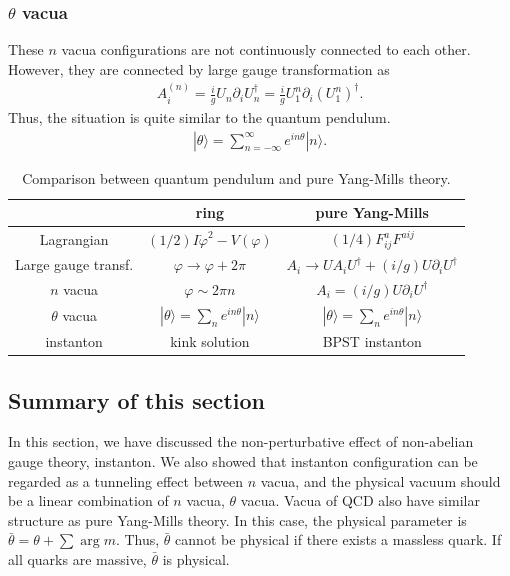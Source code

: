 \documentclass[11pt,a4paper]{article}
\begin{document}
\subsubsection{$\theta$ vacua}
These $n$ vacua configurations are not continuously connected to each other. However, they are connected by large gauge transformation as
\begin{align}
    A_i^{(n)} = \frac{i}{g} U_n \partial_i U_n^\dagger = \frac{i}{g} U_1^n \partial_i (U_1^n)^\dagger.
\end{align}
Thus, the situation is quite similar to the quantum pendulum.
\begin{align}
    |\theta\rangle = \sum_{n=-\infty}^\infty e^{i n \theta} |n\rangle.
\end{align}

\begin{table}
\centering
\begin{tabular}{c||c|c}
& ring & pure Yang-Mills \\\hline\hline
Lagrangian & $(1/2) I \dot\varphi^2 - V(\varphi)$ & $(1/4) F_{ij}^a F^{aij}$ \\\hline
Large gauge transf. & $\varphi \to \varphi + 2\pi$ & $A_i \to U A_i U^\dagger + (i/g) U \partial_i U^\dagger$ \\\hline
$n$ vacua & $\varphi\sim 2\pi n$ & $A_i = (i/g) U \partial_i U^\dagger$ \\\hline
$\theta$ vacua & $|\theta\rangle = \sum_n e^{i n \theta} |n\rangle$ & $|\theta\rangle = \sum_n e^{i n \theta} |n\rangle$ \\\hline
instanton & kink solution & BPST instanton
\end{tabular}
\caption{Comparison between quantum pendulum and pure Yang-Mills theory.}
\end{table}


\subsection{Summary of this section}
In this section, we have discussed the non-perturbative effect of non-abelian gauge theory, instanton. We also showed that instanton configuration can be regarded as a tunneling effect between $n$ vacua, and the physical vacuum should be a linear combination of $n$ vacua, $\theta$ vacua.
Vacua of QCD also have similar structure as pure Yang-Mills theory. In this case, the physical parameter is $\bar\theta = \theta + \sum\arg m$. Thus, $\bar\theta$ cannot be physical if there exists a massless quark. If all quarks are massive, $\bar\theta$ is physical.
\end{document}
